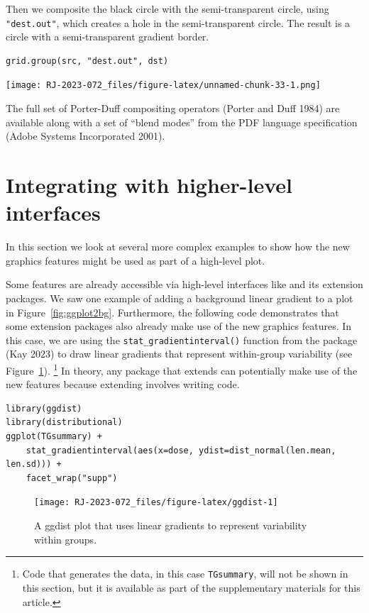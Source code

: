 Then we composite the black circle with the semi-transparent circle,
using \texttt{"dest.out"}, which creates a hole in the semi-transparent circle.
The result is a circle with a semi-transparent
gradient border.

\begin{verbatim}
grid.group(src, "dest.out", dst)
\end{verbatim}

\texttt{[image: RJ-2023-072\_files/figure-latex/unnamed-chunk-33-1.png]}

The full set of Porter-Duff compositing operators (Porter and Duff 1984)
are available along with a set of ``blend modes'' from
the PDF language specification (Adobe Systems Incorporated 2001).

\hypertarget{integration}{%
\section{Integrating with higher-level interfaces}\label{integration}}

In this section we look at several more complex
examples to show how the new graphics features might be
used as part of a high-level plot.

Some features are already accessible via high-level interfaces like
 and its extension packages. We saw one example of
adding a background linear gradient to a  plot
in Figure~\ref{fig:ggplot2bg}.
Furthermore, the following code demonstrates that some  extension
packages also already make use of the new graphics features. In this case,
we are using the \texttt{stat\_gradientinterval()} function from the
 package (Kay 2023)
to draw linear gradients that represent within-group variability
(see Figure~\ref{fig:ggdist}).
\footnote{Code that generates the data, in this case \texttt{TGsummary}, will not be
  shown in this section, but it is available as part of the supplementary
  materials for this article.}
In theory, any package that extends  can potentially
make use of the
new features because extending  involves writing
 code.

\begin{verbatim}
library(ggdist)
library(distributional)
ggplot(TGsummary) +
    stat_gradientinterval(aes(x=dose, ydist=dist_normal(len.mean, len.sd))) +
    facet_wrap("supp")
\end{verbatim}

\begin{figure}[h]
\texttt{[image: RJ-2023-072\_files/figure-latex/ggdist-1]} \caption{A ggdist plot that uses linear gradients to represent variability within groups.}\label{fig:ggdist}
\end{figure}

